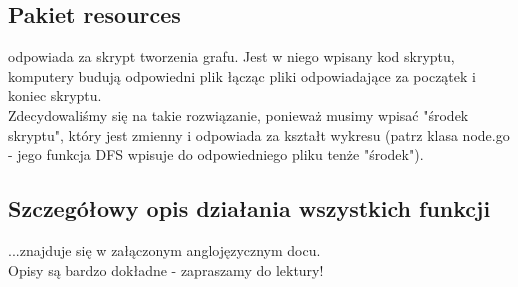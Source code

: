 \subsection{Pakiet resources}
odpowiada za skrypt tworzenia grafu. Jest w niego wpisany kod skryptu, komputery budują odpowiedni plik łącząc pliki odpowiadające za początek i koniec skryptu.\\
Zdecydowaliśmy się na takie rozwiązanie, ponieważ musimy wpisać "środek skryptu", który jest zmienny i odpowiada za kształt wykresu (patrz klasa node.go - jego funkcja DFS wpisuje do odpowiedniego pliku tenże "środek").

\subsection{Szczegółowy opis działania wszystkich funkcji}
...znajduje się w załączonym anglojęzycznym docu.\\
Opisy są bardzo dokładne - zapraszamy do lektury!
